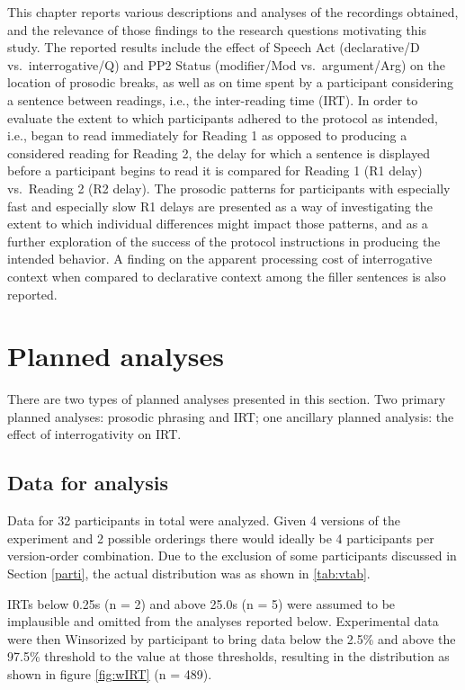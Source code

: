 \documentclass[11pt,oneside]{book}
\begin{document}
This chapter reports various descriptions and analyses of the recordings obtained, and the relevance of those findings to the research questions motivating this study. The reported results include the effect of Speech Act (declarative/D vs.~interrogative/Q) and PP2 Status (modifier/Mod vs.~argument/Arg) on the location of prosodic breaks, as well as on time spent by a participant considering a sentence between readings, i.e., the inter-reading time (IRT). In order to evaluate the extent to which participants adhered to the protocol as intended, i.e., began to read immediately for Reading 1 as opposed to producing a considered reading for Reading 2, the delay for which a sentence is displayed before a participant begins to read it is compared for Reading 1 (R1 delay) vs.~Reading 2 (R2 delay). The prosodic patterns for participants with especially fast and especially slow R1 delays are presented as a way of investigating the extent to which individual differences might impact those patterns, and as a further exploration of the success of the protocol instructions in producing the intended behavior. A finding on the apparent processing cost of interrogative context when compared to declarative context among the filler sentences is also reported.

\hypertarget{planned-analyses}{%
\section{Planned analyses}\label{planned-analyses}}

There are two types of planned analyses presented in this section. Two primary planned analyses: prosodic phrasing and IRT; one ancillary planned analysis: the effect of interrogativity on IRT.

\hypertarget{data}{%
\subsection{Data for analysis}\label{data}}

Data for 32 participants in total were analyzed. Given 4 versions of the experiment and 2 possible orderings there would ideally be 4 participants per version-order combination. Due to the exclusion of some participants discussed in Section \ref{parti}, the actual distribution was as shown in \ref{tab:vtab}.

IRTs below 0.25s (n = 2) and above 25.0s (n = 5) were assumed to be implausible and omitted from the analyses reported below. Experimental data were then Winsorized by participant to bring data below the 2.5\% and above the 97.5\% threshold to the value at those thresholds, resulting in the distribution as shown in figure \ref{fig:wIRT} (n = 489).
\end{document}
